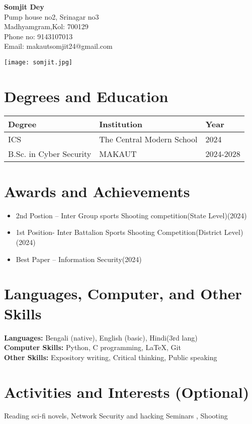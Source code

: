 \documentclass[12pt]{article}
\begin{document}
\begin{minipage}{0.7\textwidth}
    \Huge \textbf{Somjit Dey} \\[6pt]
    \normalsize
    Pump house no2, Srinagar no3\\
    Madhyamgram,Kol: 700129\\
    Phone no: 9143107013 \\
    Email: makautsomjit24@gmail.com
\end{minipage}
\hfill
\begin{minipage}{0.25\textwidth}
 \texttt{[image: somjit.jpg]} %
\end{minipage}

\vspace{1em}

\section*{Degrees and Education}
\begin{tabularx}{\textwidth}{|X|X|X|}
\hline
\textbf{Degree} & \textbf{Institution} & \textbf{Year} \\
\hline
ICS & The Central Modern School & 2024 \\
\hline
B.Sc. in Cyber Security & MAKAUT & 2024-2028\\
\hline
\end{tabularx}

\section*{Awards and Achievements}
\begin{itemize}
    \item 2nd Postion – Inter Group sports Shooting competition(State Level)(2024)
    \item 1st Position- Inter Battalion Sports Shooting Competition(District Level)(2024)
    \item Best Paper – Information Security(2024)
\end{itemize}

\section*{Languages, Computer, and Other Skills}
\textbf{Languages:} Bengali (native), English (basic), Hindi(3rd lang) \\
\textbf{Computer Skills:} Python, C programming, LaTeX, Git \\
\textbf{Other Skills:} Expository writing, Critical thinking, Public speaking 

\section*{Activities and Interests (Optional)}
Reading sci-fi novels, Network Security and hacking Seminars , Shooting
\end{document}
